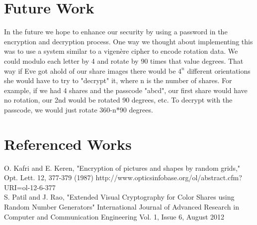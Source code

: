 \documentclass{article}
\begin{document}
\section*{Future Work}
In the future we hope to enhance our security by using a password in the encryption and decryption process.  One way we thought about implementing this was to use a system similar to a vigenère cipher to encode rotation data.  We could modulo each letter by 4 and rotate by 90 times that value degrees.  That way if Eve got ahold of our share images there would be $4^n$ different orientations she would have to try to "decrypt" it, where n is the number of shares.  For example, if we had 4 shares and the passcode "abcd", our first share would have no rotation, our 2nd would be rotated 90 degrees, etc.  To decrypt with the passcode, we would just rotate 360-n*90 degrees.  
\section*{Referenced Works}
O. Kafri and E. Keren, "Encryption of pictures and shapes by random grids," Opt. Lett. 12, 377-379 (1987) 
http://www.opticsinfobase.org/ol/abstract.cfm?URI=ol-12-6-377
\\

S. Patil and J. Rao, "Extended Visual Cryptography for Color Shares using Random Number Generators" International Journal of Advanced Research in Computer and Communication Engineering 
 Vol. 1, Issue 6, August 2012 
\end{document}
